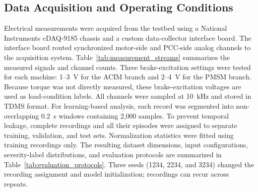 \documentclass[letterpaper,journal]{IEEEtran}
\begin{document}
\subsection{Data Acquisition and Operating Conditions}
\label{sec:data_acquisition}

Electrical measurements were acquired from the testbed using a National Instruments cDAQ-9185 chassis and a custom data-collector interface board. The interface board routed synchronized motor-side and PCC-side analog channels to the acquisition system. Table~\ref{tab:measurement_streams} summarizes the measured signals and channel counts. Three brake-excitation settings were tested for each machine: 1--3~V for the ACIM branch and 2--4~V for the PMSM branch. Because torque was not directly measured, these brake-excitation voltages are used as load-condition labels. All channels were sampled at 10~kHz and stored in TDMS format. For learning-based analysis, each record was segmented into non-overlapping 0.2~s windows containing 2{,}000 samples. To prevent temporal leakage, complete recordings and all their episodes were assigned to separate training, validation, and test sets. Normalization statistics were fitted using training recordings only. The resulting dataset dimensions, input configurations, severity-label distributions, and evaluation protocols are summarized in Table~\ref{tab:evaluation_protocols}. Three seeds (1234, 2234, and 3234) changed the recording assignment and model initialization; recordings can recur across repeats.
\end{document}
